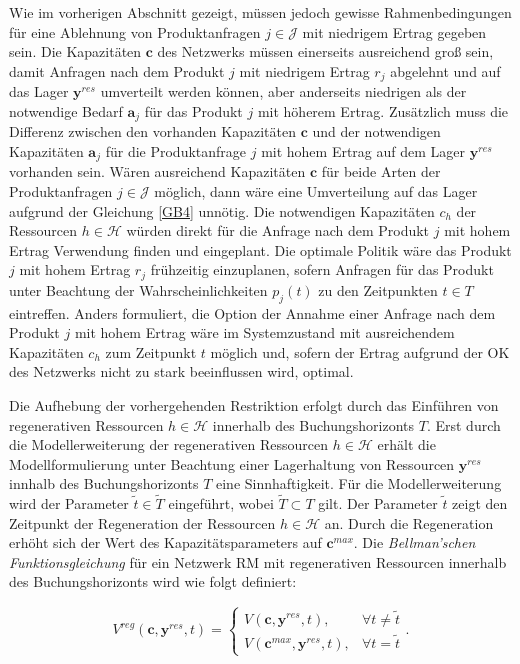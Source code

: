 Wie im vorherigen Abschnitt gezeigt, müssen jedoch gewisse Rahmenbedingungen für eine Ablehnung von Produktanfragen $j\in\mathcal{J}$ mit niedrigem Ertrag gegeben sein. Die Kapazitäten $\textbf{c}$ des Netzwerks müssen einerseits ausreichend groß sein, damit Anfragen nach dem Produkt $j$ mit niedrigem Ertrag $r_{j}$ abgelehnt und auf das Lager $\textbf{y}^{res}$ umverteilt werden können, aber anderseits niedrigen als der notwendige Bedarf $\textbf{a}_{j}$ für das Produkt $j$ mit höherem Ertrag. Zusätzlich muss die Differenz zwischen den vorhanden Kapazitäten $\textbf{c}$ und der notwendigen Kapazitäten $\textbf{a}_{j}$ für die Produktanfrage $j$ mit hohem Ertrag auf dem Lager $\textbf{y}^{res}$ vorhanden sein. Wären ausreichend Kapazitäten $\textbf{c}$ für beide Arten der Produktanfragen $j\in\mathcal{J}$ möglich, dann wäre eine Umverteilung auf das Lager aufgrund der Gleichung \eqref{GB4} unnötig. Die notwendigen Kapazitäten $c_{h}$ der Ressourcen $h\in\mathcal{H}$ würden direkt für die Anfrage nach dem Produkt $j$ mit hohem Ertrag Verwendung finden und eingeplant. Die optimale Politik wäre das Produkt $j$ mit hohem Ertrag $r_{j}$ frühzeitig einzuplanen, sofern Anfragen für das Produkt unter Beachtung der Wahrscheinlichkeiten $p_{j}(t)$ zu den Zeitpunkten $t\in T$ eintreffen. Anders formuliert, die Option der Annahme einer Anfrage nach dem Produkt $j$ mit hohem Ertrag wäre im Systemzustand mit ausreichendem Kapazitäten $c_{h}$ zum Zeitpunkt $t$ möglich und, sofern der Ertrag aufgrund der OK des Netzwerks nicht zu stark beeinflussen wird, optimal.

Die Aufhebung der vorhergehenden Restriktion erfolgt durch das Einführen von regenerativen Ressourcen $h\in\mathcal{H}$ innerhalb des Buchungshorizonts $T$. Erst durch die Modellerweiterung der regenerativen Ressourcen $h\in\mathcal{H}$ erhält die Modellformulierung unter Beachtung einer Lagerhaltung von Ressourcen $\textbf{y}^{res}$ innhalb des Buchungshorizonts $T$ eine Sinnhaftigkeit. Für die Modellerweiterung wird der Parameter $\tilde{t}\in\tilde{T}$ eingeführt, wobei $\tilde{T}\subset T$ gilt. Der Parameter $\tilde{t}$ zeigt den Zeitpunkt der Regeneration der Ressourcen $h\in\mathcal{H}$ an. Durch die Regeneration erhöht sich der Wert des Kapazitätsparameters auf $\textbf{c}^{max}$. Die \textit{Bellman'schen Funktionsgleichung} für ein Netzwerk RM mit regenerativen Ressourcen innerhalb des Buchungshorizonts wird wie folgt definiert:

\begin{equation}\label{reg}
     V^{reg}(\textbf{c}, \textbf{y}^{res}, t)=\left\{\begin{array}{ll} V(\textbf{c}, \textbf{y}^{res}, t), & \forall t\neq\tilde{t}\\
         V(\textbf{c}^{max}, \textbf{y}^{res}, t), &\forall t=\tilde{t}\end{array}\right. .
\end{equation}

